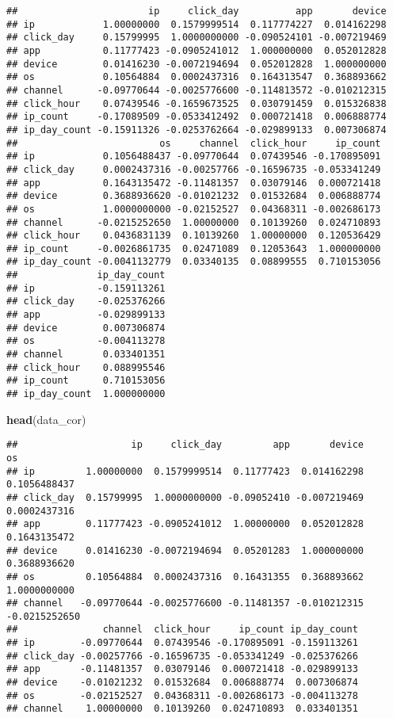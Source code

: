 \documentclass[]{article}
\newenvironment{Shaded}{\begin{snugshade}}{\end{snugshade}}
\newcommand{\KeywordTok}[1]{\textcolor[rgb]{0.13,0.29,0.53}{\textbf{#1}}}
\newcommand{\NormalTok}[1]{#1}
\begin{document}
\begin{verbatim}
##                       ip     click_day          app       device
## ip            1.00000000  0.1579999514  0.117774227  0.014162298
## click_day     0.15799995  1.0000000000 -0.090524101 -0.007219469
## app           0.11777423 -0.0905241012  1.000000000  0.052012828
## device        0.01416230 -0.0072194694  0.052012828  1.000000000
## os            0.10564884  0.0002437316  0.164313547  0.368893662
## channel      -0.09770644 -0.0025776600 -0.114813572 -0.010212315
## click_hour    0.07439546 -0.1659673525  0.030791459  0.015326838
## ip_count     -0.17089509 -0.0533412492  0.000721418  0.006888774
## ip_day_count -0.15911326 -0.0253762664 -0.029899133  0.007306874
##                         os     channel  click_hour     ip_count
## ip            0.1056488437 -0.09770644  0.07439546 -0.170895091
## click_day     0.0002437316 -0.00257766 -0.16596735 -0.053341249
## app           0.1643135472 -0.11481357  0.03079146  0.000721418
## device        0.3688936620 -0.01021232  0.01532684  0.006888774
## os            1.0000000000 -0.02152527  0.04368311 -0.002686173
## channel      -0.0215252650  1.00000000  0.10139260  0.024710893
## click_hour    0.0436831139  0.10139260  1.00000000  0.120536429
## ip_count     -0.0026861735  0.02471089  0.12053643  1.000000000
## ip_day_count -0.0041132779  0.03340135  0.08899555  0.710153056
##              ip_day_count
## ip           -0.159113261
## click_day    -0.025376266
## app          -0.029899133
## device        0.007306874
## os           -0.004113278
## channel       0.033401351
## click_hour    0.088995546
## ip_count      0.710153056
## ip_day_count  1.000000000
\end{verbatim}

\begin{Shaded}
\begin{Highlighting}[]
\KeywordTok{head}\NormalTok{(data_cor)}
\end{Highlighting}
\end{Shaded}

\begin{verbatim}
##                    ip     click_day         app       device            os
## ip         1.00000000  0.1579999514  0.11777423  0.014162298  0.1056488437
## click_day  0.15799995  1.0000000000 -0.09052410 -0.007219469  0.0002437316
## app        0.11777423 -0.0905241012  1.00000000  0.052012828  0.1643135472
## device     0.01416230 -0.0072194694  0.05201283  1.000000000  0.3688936620
## os         0.10564884  0.0002437316  0.16431355  0.368893662  1.0000000000
## channel   -0.09770644 -0.0025776600 -0.11481357 -0.010212315 -0.0215252650
##               channel  click_hour     ip_count ip_day_count
## ip        -0.09770644  0.07439546 -0.170895091 -0.159113261
## click_day -0.00257766 -0.16596735 -0.053341249 -0.025376266
## app       -0.11481357  0.03079146  0.000721418 -0.029899133
## device    -0.01021232  0.01532684  0.006888774  0.007306874
## os        -0.02152527  0.04368311 -0.002686173 -0.004113278
## channel    1.00000000  0.10139260  0.024710893  0.033401351
\end{verbatim}
\end{document}

